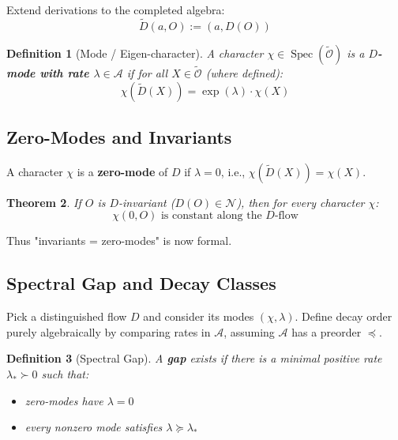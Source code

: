 \documentclass[12pt, oneside]{article}
\newtheorem{theorem}{Theorem}[section]
\newtheorem{definition}[theorem]{Definition}
\DeclareMathOperator{\Spec}{Spec}
\newcommand{\N}{\mathcal{N}}
\newcommand{\A}{\mathcal{A}}
\newcommand{\Opr}{\mathcal{O}}
\begin{document}
Extend derivations to the completed algebra:
\begin{equation}
\widetilde{D}(a, O) := (a, D(O))
\end{equation}

\begin{definition}[Mode / Eigen-character]
A character $\chi \in \Spec(\widetilde{\Opr})$ is a \textbf{$D$-mode with rate $\lambda \in \A$} if for all $X \in \widetilde{\Opr}$ (where defined):
\begin{equation}
\chi(\widetilde{D}(X)) = \exp(\lambda) \cdot \chi(X)
\end{equation}
\end{definition}

\subsection{Zero-Modes and Invariants}

A character $\chi$ is a \textbf{zero-mode} of $D$ if $\lambda = 0$, i.e., $\chi(\widetilde{D}(X)) = \chi(X)$.

\begin{theorem}
If $O$ is $D$-invariant ($D(O) \in \N$), then for every character $\chi$:
\begin{equation}
\chi(0, O) \text{ is constant along the $D$-flow}
\end{equation}
\end{theorem}

Thus "invariants = zero-modes" is now formal.

\subsection{Spectral Gap and Decay Classes}

Pick a distinguished flow $D$ and consider its modes $(\chi, \lambda)$. Define decay order purely algebraically by comparing rates in $\A$, assuming $\A$ has a preorder $\preceq$.

\begin{definition}[Spectral Gap]
A \textbf{gap} exists if there is a minimal positive rate $\lambda_* \succ 0$ such that:
\begin{itemize}
    \item zero-modes have $\lambda = 0$
    \item every nonzero mode satisfies $\lambda \succeq \lambda_*$
\end{itemize}
\end{definition}
\end{document}
